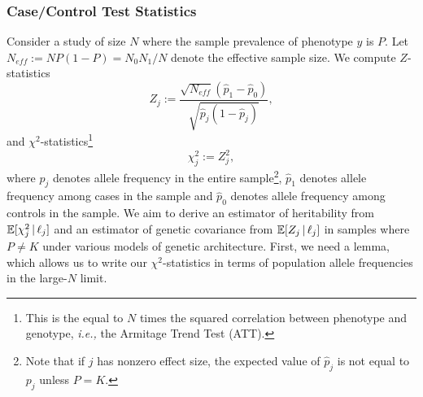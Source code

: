 \documentclass[11pt]{article}
\numberwithin{equation}{section}
\numberwithin{definition}{section}
\numberwithin{thm}{section}
\numberwithin{lemma}{section}
\numberwithin{prop}{section}
\numberwithin{cor}{section}
\numberwithin{hyp}{section}
\begin{document}
\subsubsection{Case/Control Test Statistics}\label{CCA:Case/Control Test Statistics}


Consider a study of size $N$ where the sample prevalence of phenotype $y$ is $P$. 
Let $N_{eff} := NP(1-P) = N_0N_1/N $ denote the effective sample size.
We compute $Z$-statistics
\begin{equation}
\label{z}
Z_j := 
\frac
	{\sqrt{N_{eff}}(\hat{p}_1 - \hat{p}_0)} 
	{\sqrt{\hat{p}_j(1-\hat{p}_j)}},
\end{equation}
and
$\chi^2$-statistics\footnote{
This is the equal to $N$ times the squared correlation between phenotype and genotype,
\emph{i.e.,} the Armitage Trend Test (ATT).}
\begin{equation}
\label{chisq}
	\chi^2_j := Z_j^2,
\end{equation}
where $\hat{p}_j$ denotes allele frequency in the entire sample\footnote{
Note that if $j$ has nonzero effect size, the expected value of $\hat{p}_j$ is not equal to $p_j$ 
unless $P=K$.},
$\hat{p}_1$ denotes allele frequency among cases in the sample
and $\hat{p}_0$ denotes allele frequency among controls in the sample.
We aim to derive an estimator of heritability from $\mathbb{E}[\chi^2_j\,|\,\ell_j]$ and an estimator of genetic covariance from $\mathbb{E}[Z_j\,|\,\ell_j]$ 
in samples where $P\neq K$ under various models of genetic architecture.
First, we need a lemma, which allows us to write our $\chi^2$-statistics in terms of population allele frequencies in the large-$N$ limit.
\end{document}

